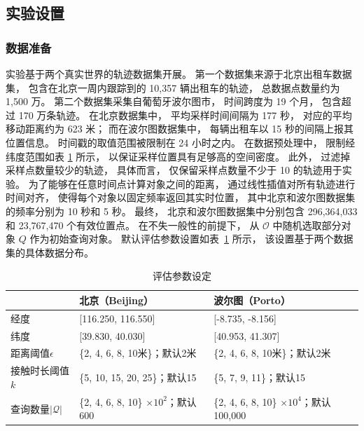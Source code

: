 \subsection{实验设置}

\subsubsection*{数据准备}




实验基于两个真实世界的轨迹数据集开展。 第一个数据集来源于北京出租车数据集，
包含在北京一周内跟踪到的 10,357 辆出租车的轨迹， 总数据点数量约为 1,500 万。
第二个数据集采集自葡萄牙波尔图市， 时间跨度为 19 个月， 包含超过 170 万条轨迹。
在北京数据集中， 平均采样时间间隔为 177 秒， 对应的平均移动距离约为 623 米；
而在波尔图数据集中， 每辆出租车以 15 秒的间隔上报其位置信息。
时间戳的取值范围被限制在 24 小时之内。
在数据预处理中， 限制经纬度范围如表 \ref{contact_tb:para} 所示， 以保证采样位置具有足够高的空间密度。
此外， 过滤掉采样点数量较少的轨迹， 具体而言， 仅保留采样点数量不少于 10 的轨迹用于实验。 为了能够在任意时间点计算对象之间的距离，
通过线性插值对所有轨迹进行时间对齐， 使得每个对象以固定频率返回其实时位置，
其中北京和波尔图数据集的频率分别为 10 秒和 5 秒。
最终， 北京和波尔图数据集中分别包含 296,364,033 和 23,767,470 个有效位置点。
在不失一般性的前提下， 从 $\mathcal{O}$ 中随机选取部分对象 $Q$ 作为初始查询对象。 默认评估参数设置如表~\ref{contact_tb:para} 所示， 该设置基于两个数据集的具体数据分布。

\begin{table}[!ht]
    \caption{评估参数设定}\label{contact_tb:para}
    \begin{tabular}{l|ll}
    \toprule
        &\textbf{北京（Beijing）}&\textbf{波尔图（Porto）}\\
    \midrule
        经度 & [116.250, 116.550] & [-8.735, -8.156] \\
        纬度 & [39.830, 40.030] & [40.953, 41.307] \\
        距离阈值$\epsilon$ & \{2, 4, 6, 8, 10米\}；默认2米 & \{2, 4, 6, 8, 10米\}；默认2米  \\
        接触时长阈值$k$ & \{5, 10, 15, 20, 25\}；默认15 & \{5, 7, 9, 11\}；默认15 \\
        查询数量$|\mathcal{Q}|$ & \{2, 4, 6, 8, 10\} $\times 10^2$；默认600  & \{2, 4, 6, 8, 10\} $\times 10^4$；默认100,000 \\
    \bottomrule
    \end{tabular}
\end{table}


